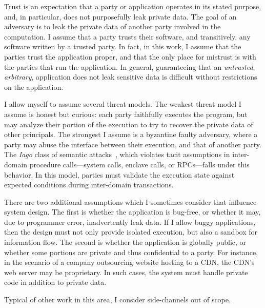 Trust is an expectation that a party or application operates in its stated
purpose, and, in particular, does not purposefully leak private data.
%
The goal of an adversary is to leak the private data of another party involved
in the computation.
%
I assume that a party trusts their software, and transitively, any software
written by a trusted party.
%
In fact, in this work, I  assume that the parties trust the application proper,
and that the only place for mistrust is with the parties that run the
application.
%
In general, guaranteeing that an \emph{untrusted}, \emph{arbitrary},
application does not leak sensitive data is difficult without restrictions on
the application.


I allow myself to assume several threat models.
%
The weakest threat model I assume is honest but curious: each party faithfully
executes the program, but may analyze their portion of the execution to try to
recover the private data of other principals.
%
The strongest I assume is a byzantine faulty adversary, where a party may
abuse the interface between their execution, and that of another party.
%
The \emph{Iago} class of semantic attacks~\cite{iago-attacks}, which violates
tacit assumptions in inter-domain procedure calls---system calls, enclave
calls, or RPCs---falls under this behavior.
%
In this model, parties must validate the execution state against expected
conditions during inter-domain transactions.


There are two additional assumptions which I sometimes consider that
influence system design.
%
The first is whether the application is bug-free, or whether it may, due to
programmer error, inadvertently leak data.
%
If I allow buggy applications, then the design must not only provide isolated
execution, but also a sandbox for information flow.
%
The second is whether the application is globally public, or whether some
portions are private and thus confidential to a party. 
%
For instance, in the scenario of a company outsourcing website hosting to a CDN,
the CDN's web server may be proprietary.
%
In such cases, the system must handle private code in addition to private data.


Typical of other work in this area, I consider side-channels out of scope.
